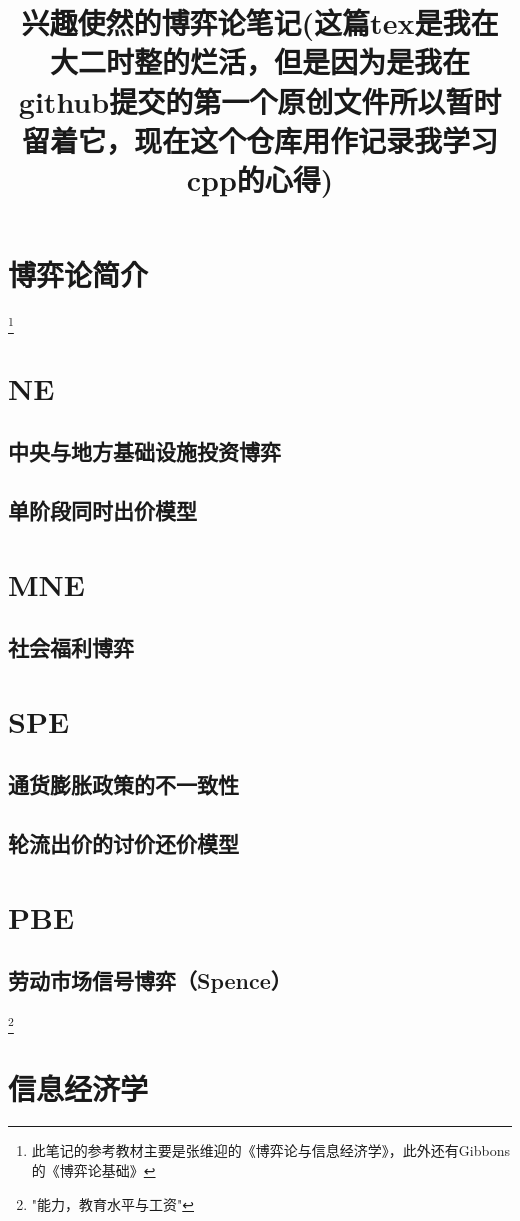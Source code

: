 \documentclass{article}
\begin{document}
\title{兴趣使然的博弈论笔记(这篇tex是我在大二时整的烂活，但是因为是我在github提交的第一个原创文件所以暂时留着它，现在这个仓库用作记录我学习cpp的心得)}
\maketitle
\tableofcontents
\section{博弈论简介} \footnote{此笔记的参考教材主要是张维迎的《博弈论与信息经济学》，此外还有Gibbons的《博弈论基础》}
\section{NE}
\subsection{中央与地方基础设施投资博弈}
\subsection{单阶段同时出价模型}
\section{MNE}
\subsection{社会福利博弈}
\section{SPE}
\subsection{通货膨胀政策的不一致性}
\subsection{轮流出价的讨价还价模型}
\section{PBE}
\subsection{劳动市场信号博弈（Spence）}\footnote{"能力，教育水平与工资"}
\section{信息经济学}
\end{document}
